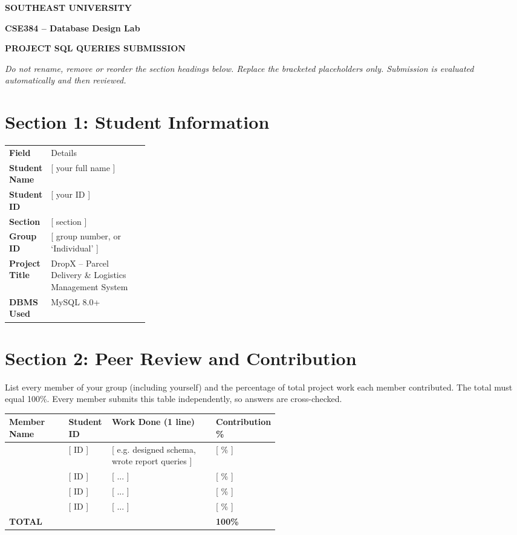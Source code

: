 \documentclass[10pt,letterpaper]{article}
\newcommand{\fieldtable}[1]{%
  \begin{tabularx}{\linewidth}{>{\bfseries\columncolor{rule!52}}p{0.27\linewidth}|X}
    \rowcolor{accent}\color{onaccent}Field & \color{onaccent}Details\\
    #1
  \end{tabularx}}
\begin{document}
\begin{center}
  {\Large\bfseries SOUTHEAST UNIVERSITY}\par
  {\large\bfseries CSE384 -- Database Design Lab}\par
  {\large\bfseries\color{accent} PROJECT SQL QUERIES SUBMISSION}\par
\end{center}

\textit{Do not rename, remove or reorder the section headings below. Replace the bracketed placeholders only. Submission is evaluated automatically and then reviewed.}

\section{Section 1: Student Information}

\fieldtable{
  Student Name & [ your full name ]\\
  Student ID & [ your ID ]\\
  Section & [ section ]\\
  Group ID & [ group number, or `Individual' ]\\
  Project Title & DropX -- Parcel Delivery \& Logistics Management System\\
  DBMS Used & MySQL 8.0+\\
}

\section{Section 2: Peer Review and Contribution}

List every member of your group (including yourself) and the percentage of total project work each member contributed. The total must equal 100\%. Every member submits this table independently, so answers are cross-checked.

\begin{tabularx}{\linewidth}{|p{0.22\linewidth}|p{0.16\linewidth}|X|p{0.14\linewidth}|}
  \hline
  \rowcolor{accent}\color{onaccent}\bfseries Member Name & \color{onaccent}\bfseries Student ID & \color{onaccent}\bfseries Work Done (1 line) & \color{onaccent}\bfseries Contribution \%\\
  \hline
  [ name ] & [ ID ] & [ e.g. designed schema, wrote report queries ] & [ \% ]\\ \hline
  [ name ] & [ ID ] & [ ... ] & [ \% ]\\ \hline
  [ name ] & [ ID ] & [ ... ] & [ \% ]\\ \hline
  [ name ] & [ ID ] & [ ... ] & [ \% ]\\ \hline
  \textbf{TOTAL} & & & \textbf{100\%}\\ \hline
\end{tabularx}
\end{document}
